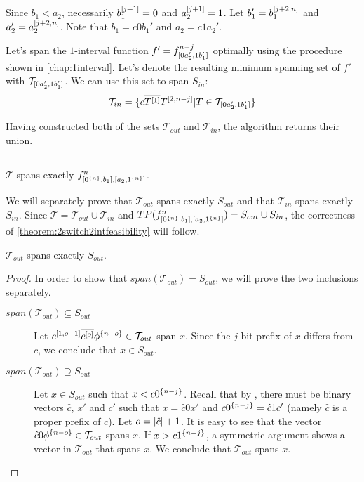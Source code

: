 \begin{description}
Since $b_1 < a_2$,
necessarily $b_1^{[j+1]} = 0$ and $a_2^{[j+1]} = 1$.
Let $b_1' = b_1^{[j+2, n]}$
and $a_2' = a_2^{[j+2, n]}$.
Note that $b_1 = c 0 b_1'$ and $a_2 = c 1 a_2'$.

Let's span the $1$-interval function
$f' = f^{n-j}_{[0 a_2', 1 b_1']}$
optimally using the procedure shown in \cref{chap:1interval}.
Let's denote the resulting minimum spanning set of $f'$
with $\mathcal{T}_{[0 a_2', 1 b_1']}$.
We can use this set to span $S_{in}$:
$$
\mathcal{T}_{in} =
\{c \overline{T^{[1]}} T^{[2, n-j]}
| T \in \mathcal{T}_{[0 a_2', 1 b_1']}\}
$$

Having constructed both of the sets
$\mathcal{T}_{out}$ and $\mathcal{T}_{in}$,
the algorithm returns their union.
\end{description}

\subsection{\titlefeasibility}

\begin{theorem}
\label{theorem:2switch2intfeasibility}
$\mathcal{T}$ spans exactly $f^{n}_{[0^{\{n\}}, b_1], [a_2, 1^{\{n\}}]}$.
\end{theorem}

We will separately prove that $\mathcal{T}_{out}$ spans exactly $S_{out}$
and that $\mathcal{T}_{in}$ spans exactly $S_{in}$.
Since $\mathcal{T} = \mathcal{T}_{out} \cup \mathcal{T}_{in}$
and $TP(f^{n}_{[0^{\{n\}}, b_1], [a_2, 1^{\{n\}}]}) = S_{out} \cup S_{in}$,
the correctness of
\cref{theorem:2switch2intfeasibility} will follow.

\begin{lemma}
$\mathcal{T}_{out}$ spans exactly $S_{out}$.
\end{lemma}

\begin{proof}
In order to show that
$span(\mathcal{T}_{out}) = S_{out}$,
we will prove the two inclusions separately.

\begin{description}
\item[$span(\mathcal{T}_{out}) \subseteq S_{out}$]
Let $c^{[1, o-1]} \overline{c^{[o]}} \phi^{\{n-o\}}
\in \mathcal{T}_{out}$
span $x$.
Since the $j$-bit prefix of $x$ differs from $c$,
we conclude that $x \in S_{out}$.

\item[$span(\mathcal{T}_{out}) \supseteq S_{out}$]
Let $x \in S_{out}$ such that $x < c 0^{\{n-j\}}$.
Recall that by ,
there must be binary vectors $\hat{c}$, $x'$ and $c'$
such that $x = \hat{c} 0 x'$
and $c 0^{\{n-j\}} = \hat{c} 1 c'$
(namely $\hat{c}$ is a proper prefix of $c$).
Let $o = \lvert\hat{c}\rvert + 1$.
It is easy to see that the vector
$\hat{c} 0 \phi^{\{n-o\}} \in \mathcal{T}_{out}$
spans $x$.
If $x > c 1^{\{n-j\}}$,
a symmetric argument shows a vector in $\mathcal{T}_{out}$
that spans $x$.
We conclude that $\mathcal{T}_{out}$ spans $x$.
\end{description}
\end{proof}

